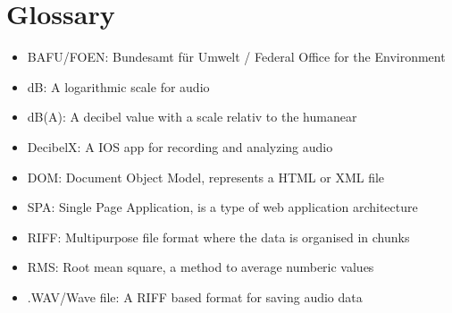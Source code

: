 \section{Glossary}
\begin{itemize}
    \item BAFU/FOEN: Bundesamt für Umwelt / Federal Office for the Environment 
    \item dB: A logarithmic scale for audio
    \item dB(A): A decibel value with a scale relativ to the humanear
    \item DecibelX: A IOS app for recording and analyzing audio
    \item DOM: Document Object Model, represents a HTML or XML file
    \item SPA: Single Page Application, is a type of web application architecture
    \item RIFF: Multipurpose file format where the data is organised in chunks
    \item RMS: Root mean square, a method to average numberic values
    \item .WAV/Wave file: A RIFF based format for saving audio data
\end{itemize}


